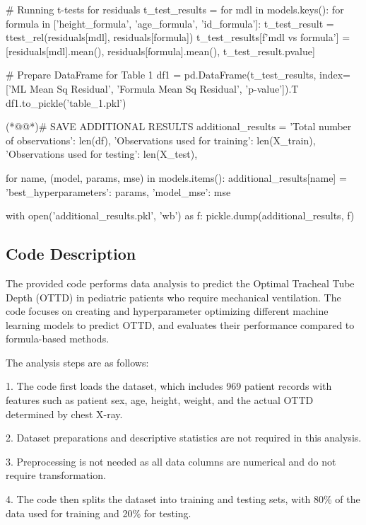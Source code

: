 \documentclass[11pt]{article}
\begin{document}
\begin{python}
# Running t-tests for residuals
t_test_results = {}
for mdl in models.keys():
    for formula in ['height_formula', 'age_formula', 'id_formula']:
        t_test_result = ttest_rel(residuals[mdl], residuals[formula])
        t_test_results[f'{mdl} vs {formula}'] = [residuals[mdl].mean(), residuals[formula].mean(), t_test_result.pvalue]

# Prepare DataFrame for Table 1
df1 = pd.DataFrame(t_test_results, index=['ML Mean Sq Residual', 'Formula Mean Sq Residual', 'p-value']).T
df1.to_pickle('table_1.pkl')

(*@@*)# SAVE ADDITIONAL RESULTS
additional_results = {
    'Total number of observations': len(df),
    'Observations used for training': len(X_train),
    'Observations used for testing': len(X_test),
}

for name, (model, params, mse) in models.items():
    additional_results[name] = {
        'best_hyperparameters': params,
        'model_mse': mse
    }

with open('additional_results.pkl', 'wb') as f:
    pickle.dump(additional_results, f)

\end{python}

\subsection{Code Description}

The provided code performs data analysis to predict the Optimal Tracheal Tube Depth (OTTD) in pediatric patients who require mechanical ventilation. The code focuses on creating and hyperparameter optimizing different machine learning models to predict OTTD, and evaluates their performance compared to formula-based methods.

The analysis steps are as follows:

1. The code first loads the dataset, which includes 969 patient records with features such as patient sex, age, height, weight, and the actual OTTD determined by chest X-ray.

2. Dataset preparations and descriptive statistics are not required in this analysis.

3. Preprocessing is not needed as all data columns are numerical and do not require transformation.

4. The code then splits the dataset into training and testing sets, with 80\% of the data used for training and 20\% for testing.
\end{document}
